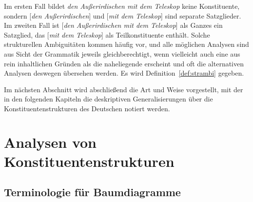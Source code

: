 \begin{exe}
  \ex\label{ex:strambiana}
  \begin{xlist}
  \end{xlist}
\end{exe}

Im ersten Fall bildet \textit{den Außerirdischen mit dem Teleskop} keine Konstituente, sondern [\textit{den Außerirdischen}] und [\textit{mit dem Teleskop}] sind separate Satzglieder.
Im zweiten Fall ist [\textit{den Außerirdischen mit dem Teleskop}] als Ganzes ein Satzglied, das [\textit{mit dem Teleskop}] als Teilkonstituente enthält.
Solche strukturellen Ambiguitäten kommen häufig vor, und alle möglichen Analysen sind aus Sicht der Grammatik jeweils gleichberechtigt, wenn vielleicht auch eine aus rein inhaltlichen Gründen als die naheliegende erscheint und oft die alternativen Analysen deswegen übersehen werden.
Es wird Definition~\ref{def:strambi} gegeben.


Im nächsten Abschnitt wird abschließend die Art und Weise vorgestellt, mit der in den folgenden Kapiteln die deskriptiven Generalisierungen über die Konstituentenstrukturen des Deutschen notiert werden.




\section{Analysen von Konstituentenstrukturen}

\label{sec:topokons}

\subsection{Terminologie für Baumdiagramme}

